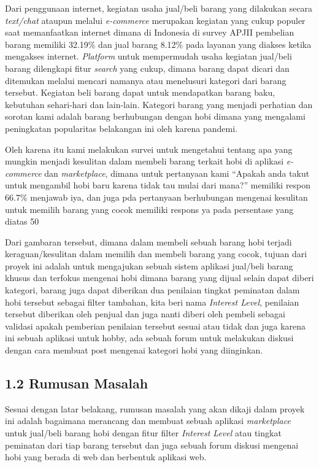\documentclass[a4paper]{article}
\begin{document}
Dari penggunaan internet, kegiatan usaha jual/beli barang yang dilakukan secara \textit{text/chat} ataupun melalui \textit{e-commerce} merupakan kegiatan yang cukup populer saat memanfaatkan internet dimana di Indonesia di survey APJII pembelian barang memiliki 32.19\% dan jual barang 8.12\% pada layanan yang diakses ketika mengakses internet\autocite{indonesia2017infografis}. \textit{Platform} untuk mempermudah usaha kegiatan jual/beli barang dilengkapi fitur \textit{search} yang cukup, dimana barang dapat dicari dan ditemukan melalui mencari namanya atau menelusuri kategori dari barang tersebut. Kegiatan beli barang dapat untuk mendapatkan barang baku, kebutuhan sehari-hari dan lain-lain. Kategori barang yang menjadi perhatian dan sorotan kami adalah barang berhubungan dengan hobi dimana yang mengalami peningkatan popularitas belakangan ini oleh karena pandemi\autocite{langstedt2022loneliness}.


Oleh karena itu kami melakukan survei untuk mengetahui tentang apa yang mungkin menjadi kesulitan dalam membeli barang terkait hobi di aplikasi \textit{e-commerce} dan \textit{marketplace}, dimana untuk pertanyaan kami “Apakah anda takut untuk mengambil hobi baru karena tidak tau mulai dari mana?” memiliki respon 66.7\% menjawab iya, dan juga pda pertanyaan berhubungan mengenai kesulitan untuk memilih barang yang cocok memiliki respons ya pada persentase yang diatas 50%


Dari gambaran tersebut, dimana dalam membeli sebuah barang hobi terjadi keraguan/kesulitan dalam memilih dan membeli barang yang cocok, tujuan dari proyek ini adalah untuk mengajukan sebuah sistem aplikasi jual/beli barang khusus dan terfokus mengenai hobi dimana barang yang dijual selain dapat diberi kategori, barang juga dapat diberikan dua penilaian tingkat peminatan dalam hobi tersebut sebagai filter tambahan, kita beri nama \textit{Interest Level}, penilaian tersebut diberikan oleh penjual dan juga nanti diberi oleh pembeli sebagai validasi apakah pemberian penilaian tersebut sesuai atau tidak dan juga karena ini sebuah aplikasi untuk hobby, ada sebuah forum untuk melakukan diskusi dengan cara membuat post mengenai kategori hobi yang diinginkan.


\subsection*{1.2 Rumusan Masalah}

Sesuai dengan latar belakang, rumusan masalah yang akan dikaji dalam proyek ini adalah bagaimana merancang dan membuat sebuah aplikasi \textit{marketplace} untuk jual/beli barang hobi dengan fitur filter \textit{Interest Level} atau tingkat peminatan dari tiap barang tersebut dan juga sebuah forum diskusi mengenai hobi yang berada di web dan berbentuk aplikasi web.
\end{document}
